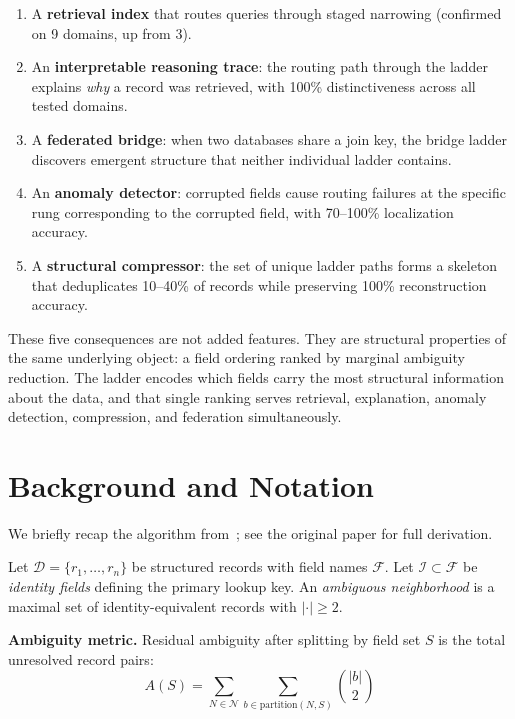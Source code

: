 \documentclass[11pt]{article}
\begin{document}
\begin{enumerate}
    \item A \textbf{retrieval index} that routes queries through staged narrowing (confirmed on 9 domains, up from 3).
    \item An \textbf{interpretable reasoning trace}: the routing path through the ladder explains \textit{why} a record was retrieved, with 100\% distinctiveness across all tested domains.
    \item A \textbf{federated bridge}: when two databases share a join key, the bridge ladder discovers emergent structure that neither individual ladder contains.
    \item An \textbf{anomaly detector}: corrupted fields cause routing failures at the specific rung corresponding to the corrupted field, with 70--100\% localization accuracy.
    \item A \textbf{structural compressor}: the set of unique ladder paths forms a skeleton that deduplicates 10--40\% of records while preserving 100\% reconstruction accuracy.
\end{enumerate}

These five consequences are not added features. They are structural properties of the same underlying object: a field ordering ranked by marginal ambiguity reduction. The ladder encodes which fields carry the most structural information about the data, and that single ranking serves retrieval, explanation, anomaly detection, compression, and federation simultaneously.

\section{Background and Notation}

We briefly recap the algorithm from~\cite{elms2026dw}; see the original paper for full derivation.

Let $\mathcal{D} = \{r_1, \ldots, r_n\}$ be structured records with field names $\mathcal{F}$. Let $\mathcal{I} \subset \mathcal{F}$ be \textit{identity fields} defining the primary lookup key. An \textit{ambiguous neighborhood} is a maximal set of identity-equivalent records with $|\cdot| \geq 2$.

\textbf{Ambiguity metric.} Residual ambiguity after splitting by field set $S$ is the total unresolved record pairs:
\begin{equation}
A(S) = \sum_{N \in \mathcal{N}} \sum_{b \in \text{partition}(N, S)} \binom{|b|}{2}
\end{equation}
\end{document}
